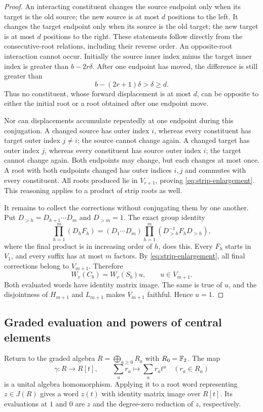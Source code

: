 \begin{proof}
An interacting constituent changes the source endpoint only
when its target is the old source; the new source is at most
$d$ positions to the left.  It changes the target endpoint only
when its source is the old target; the new target is at most
$d$ positions to the right.  These statements follow directly
from the consecutive-root relations, including their reverse
order.  An opposite-root interaction cannot occur.  Initially
the source inner index minus the target inner index is greater
than $b-2r\delta$.  After one endpoint has moved, the difference
is still greater than
\[
 b-(2r+1)\delta>\delta\geq d.
\]
Thus no constituent, whose forward displacement is at most $d$,
can be opposite to either the initial root or a root obtained
after one endpoint move.

Nor can displacements accumulate repeatedly at one endpoint
during this conjugation.  A changed source has outer index $i$,
whereas every constituent has target outer index $j\ne i$;
the source cannot change again.  A changed target has outer
index $j$, whereas every constituent has source outer index
$i$; the target cannot change again.  Both endpoints may change,
but each changes at most once.  A root with both endpoints
changed has outer indices $i,j$ and commutes with every
constituent.  All roots produced lie in $V_{r+1}$, proving
\eqref{eq:strip-enlargement}.  This reasoning applies to a product
of strip roots as well.

It remains to collect the corrections without conjugating
them by one another.  Put $D_{>h}=D_{h+1}\cdots D_m$ and
$D_{>m}=1$.  The exact group identity
\[
 \prod_{h=1}^m(D_hF_h)
  =(D_1\cdots D_m)
       \prod_{h=1}^m(D_{>h}^{-1}F_hD_{>h}),
\]
where the final product is in increasing order of $h$, does this.
Every $F_h$ starts in $V_1$, and every suffix has at most $m$
factors.  By \eqref{eq:strip-enlargement}, all final corrections
belong to $V_{m+1}$.  Therefore
\[
 W_v(C_b)=W_v(S_b)u,\qquad u\in V_{m+1}.
\]
Both evaluated words have identity matrix image.  The same is
true of $u$, and the disjointness of $H_{m+1}$ and $L_{m+1}$
makes $V_{m+1}$ faithful.  Hence $u=1$.
\end{proof}

\subsection{Graded evaluation and powers of central elements}

Return to the graded algebra $R=\bigoplus_{a\geq0}R_a$ with
$R_0=\mathbb F_2$.  The map
\[
 \gamma:R\longrightarrow R[t],\qquad
       \sum_a r_a\longmapsto\sum_a r_a t^a
       \quad(r_a\in R_a)
\]
is a unital algebra homomorphism.  Applying it to a root word
representing $z\in J(R)$ gives a word $z(t)$ with identity
matrix image over $R[t]$.  Its evaluations at $1$ and $0$ are
$z$ and the degree-zero reduction of $z$, respectively.


